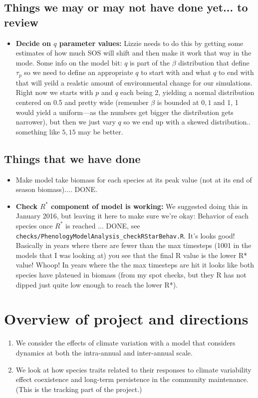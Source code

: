 \documentclass[11pt,a4paper,oneside]{article}
\begin{document}
\subsection{Things we may or may not have done yet... to review}

\begin{itemize}
\item {\bf Decide on $q$ parameter values:}
Lizzie needs to do this by getting some estimates of how much SOS will shift and then make it work that way in the mode. Some info on the model bit: $q$ is part of the $\beta$ distribution that define $\tau_{p}$ so we need to define an appropriate $q$ to start with and what $q$ to end with that will yeild a realstic amount of environmental change for our simulations. Right now we starts with $p$ and $q$ each being 2, yielding a normal distribution centered on 0.5 and pretty wide (remember $\beta$ is bounded at $0,1$ and 1, 1 would yield a uniform---as the numbers get bigger the distribution gets narrower), but then we just vary $q$ so we end up with a skewed distribution.. something like $5,15$ may be better.
\end{itemize}

\subsection{Things that we have done}

\begin{itemize}
\item Make model take biomass for each species at its peak value (not at its end of season biomass).... DONE.
\item {\bf Check $R^{*}$ component of model is working:} We suggested doing this in January 2016, but leaving it here to make sure we're okay: Behavior of each species once $R^{*}$ is reached ... DONE, see \verb|checks/PhenologyModelAnalysis_checkRStarBehav.R|. It's looks good! Basically in years where there are fewer than the max timesteps (1001 in the models that I was looking at) you see that the final R value is the lower R* value! Whoop! In years where the the max timesteps are hit it looks like both species have plateued in biomass (from my spot checks, but they R has not dipped just quite low enough to reach the lower R*). 
\end{itemize}


\newpage
\section{Overview of project and directions}
\noindent 
\begin{enumerate}
\item We consider the effects of climate variation with a model that considers dynamics at both the
intra-annual and inter-annual scale. %
\item We look at how species traits related to their responses to
  climate variability effect coexistence and long-term persistence in the community
  maintenance. (This is the tracking part of the project.) 
\end{enumerate}
\end{document}
